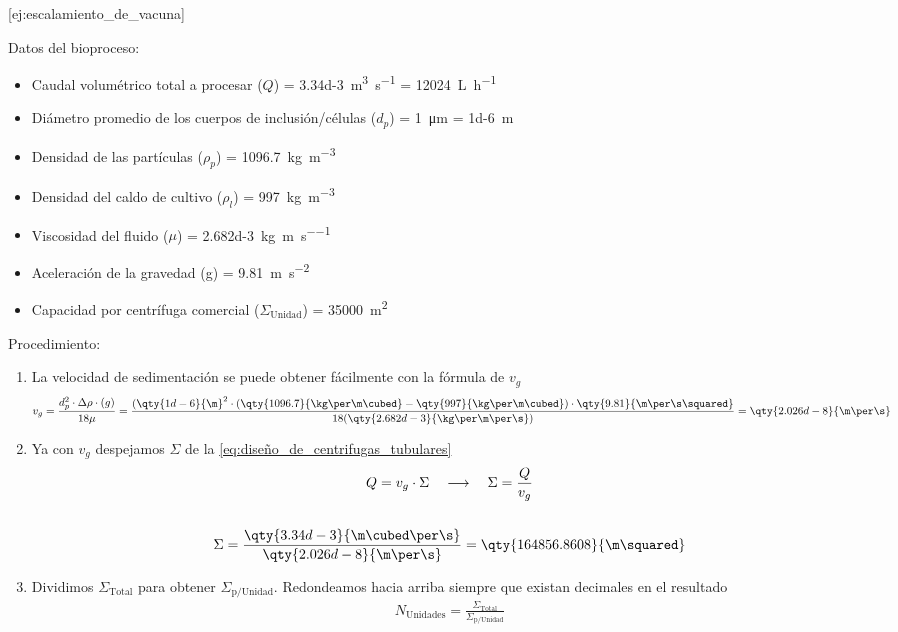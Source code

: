[ej:escalamiento_de_vacuna]{
    Datos del bioproceso:
    \begin{itemize}
        \item Caudal volumétrico total a procesar ($Q$) = \qty{3.34d-3}{\m\cubed\per\s} = \qty{12024}{\L\per\hour}
        \item Diámetro promedio de los cuerpos de inclusión/células ($d_{p}$) = \qty{1}{\micro\m} = \qty{1d-6}{\m}
        \item Densidad de las partículas ($\rho_{p}$) = \qty{1096.7}{\kg\per\m\cubed}
        \item Densidad del caldo de cultivo ($\rho_{l}$) = \qty{997}{\kg\per\m\cubed}
        \item Viscosidad del fluido ($\mu$) = \qty{2.682d-3}{\kg\per\m\per\s}
        \item Aceleración de la gravedad (g) = \qty{9.81}{\m\per\s\squared}
        \item Capacidad por centrífuga comercial ($\Sigma_{\text{Unidad}}$) = \qty{35000}{\m\squared}
    \end{itemize}
    Procedimiento:
    \begin{enumerate}
        \item La velocidad de sedimentación se puede obtener fácilmente con la fórmula de $v_{g}$ \begin{gather*}
            v_{g}=\frac{d_{p}^{2}\cdot\Delta\rho\cdot(g)}{18\mu}=\frac{(\qty{1d-6}{\m}^{2}\cdot(\qty{1096.7}{\kg\per\m\cubed}-\qty{997}{\kg\per\m\cubed})\cdot\qty{9.81}{\m\per\s\squared}}{18(\qty{2.682d-3}{\kg\per\m\per\s})}=\qty{2.026d-8}{\m\per\s}
            \end{gather*}
        \item Ya con $v_{g}$ despejamos $\Sigma$ de la \autoref{eq:diseño_de_centrifugas_tubulares} \begin{gather*}
            Q = v_{g} \cdot \Sigma \quad\longrightarrow\quad \Sigma = \frac{Q}{v_{g}}
            \\\\
            \Sigma = \frac{\qty{3.34d-3}{\m\cubed\per\s}}{\qty{2.026d-8}{\m\per\s}} = \qty{164856.8608}{\m\squared}
            \end{gather*}
        \item Dividimos $\Sigma_{\text{Total}}$ para obtener $\Sigma_{\text{p/Unidad}}$. Redondeamos hacia arriba siempre que existan decimales en el resultado \begin{gather*}
            N_{\text{Unidades}} = \frac{\Sigma_{\text{Total}}}{\Sigma_{\text{p/Unidad}}}

\end{gather*}
\end{enumerate}}
